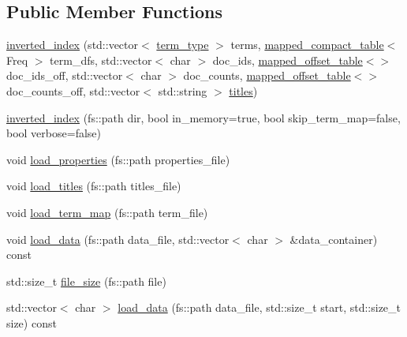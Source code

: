 \subsection*{Public Member Functions}
\begin{DoxyCompactItemize}
\item 
\mbox{\hyperlink{classirk_1_1inverted__index_ac94a8b0156be9f9afb99cb0070cc097b}{inverted\+\_\+index}} (std\+::vector$<$ \mbox{\hyperlink{classirk_1_1inverted__index_a7a60c2cec1774c08f21e8e27ccb5ac33}{term\+\_\+type}} $>$ terms, \mbox{\hyperlink{namespaceirk_a355b82a658f8685da29eca82444fed3c}{mapped\+\_\+compact\+\_\+table}}$<$ Freq $>$ term\+\_\+dfs, std\+::vector$<$ char $>$ doc\+\_\+ids, \mbox{\hyperlink{namespaceirk_ab3084e78181e92fe4bea7332e0a77e98}{mapped\+\_\+offset\+\_\+table}}$<$$>$ doc\+\_\+ids\+\_\+off, std\+::vector$<$ char $>$ doc\+\_\+counts, \mbox{\hyperlink{namespaceirk_ab3084e78181e92fe4bea7332e0a77e98}{mapped\+\_\+offset\+\_\+table}}$<$$>$ doc\+\_\+counts\+\_\+off, std\+::vector$<$ std\+::string $>$ \mbox{\hyperlink{classirk_1_1inverted__index_ac3c5100fced55578e115553c8cda9080}{titles}})
\item 
\mbox{\hyperlink{classirk_1_1inverted__index_a8b9969577ec0556c38ea05d5cc674fb8}{inverted\+\_\+index}} (fs\+::path dir, bool in\+\_\+memory=true, bool skip\+\_\+term\+\_\+map=false, bool verbose=false)
\item 
void \mbox{\hyperlink{classirk_1_1inverted__index_a592cccf4d8b77906e33e90b09f9dec7a}{load\+\_\+properties}} (fs\+::path properties\+\_\+file)
\item 
void \mbox{\hyperlink{classirk_1_1inverted__index_a0b389492f9ab680e28f801590472069c}{load\+\_\+titles}} (fs\+::path titles\+\_\+file)
\item 
void \mbox{\hyperlink{classirk_1_1inverted__index_af26ea157a030b67feff19878afbacbdd}{load\+\_\+term\+\_\+map}} (fs\+::path term\+\_\+file)
\item 
void \mbox{\hyperlink{classirk_1_1inverted__index_a231961e5ef231dabb4cd02becb64db5a}{load\+\_\+data}} (fs\+::path data\+\_\+file, std\+::vector$<$ char $>$ \&data\+\_\+container) const
\item 
std\+::size\+\_\+t \mbox{\hyperlink{classirk_1_1inverted__index_a06e5f0eb312766fe8ad96c054a9ec310}{file\+\_\+size}} (fs\+::path file)
\item 
std\+::vector$<$ char $>$ \mbox{\hyperlink{classirk_1_1inverted__index_a66e54902ec83c229af58f1f6b443ed0d}{load\+\_\+data}} (fs\+::path data\+\_\+file, std\+::size\+\_\+t start, std\+::size\+\_\+t size) const

\end{DoxyCompactItemize}
